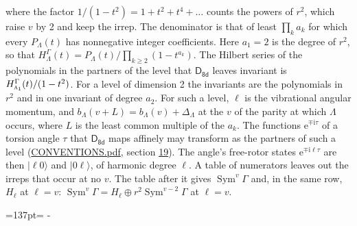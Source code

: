 \documentclass[10pt,a4paper]{article}
\newcommand{\needspace}[1]{\par\penalty-100\begingroup\dimen0=#1\relax\dimen2=\pagegoal
  \advance\dimen2-\pagetotal\ifdim\dimen0>\dimen2\relax\ifdim\dimen2>0pt\vfil\break\fi\fi
  \endgroup}
\numberwithin{equation}{section}
\newcommand{\grp}[1]{\mathsf{#1}}
\newcommand{\irr}[1]{\text{\normalfont\scshape #1}}
\newcommand{\iunit}{\mathrm{i}}
\newcommand{\expe}{\mathrm{e}}
\newcommand{\occ}[1]{\lvert #1\rangle}
\begin{document}
where the factor $1/(1 - t^2) = 1 + t^2 + t^4 + \dots$ counts the powers of $r^2$, which raise $v$ by 2 and keep the irrep. The denominator is that of least $\prod_k a_k$ for which every $P_\Lambda(t)$ has nonnegative integer coefficients. Here $a_1 = 2$ is the degree of $r^2$, so that $H^{\Gamma}_\Lambda(t) = P_\Lambda(t)/\prod_{k\ge2}(1 - t^{a_k})$. The Hilbert series of the polynomials in the partners of the level that $\grp{D_{8d}}$ leaves invariant is $H^{\Gamma}_{\irr{a}_{1}}(t)/(1 - t^2)$. For a level of dimension 2 the invariants are the polynomials in $r^2$ and in one invariant of degree $a_2$. \label{n:index.overtone.period}\label{n:index.increment.unitary}For such a level, $\ell$ is the vibrational angular momentum, and $b_\Lambda(v + L) = b_\Lambda(v) + \Delta_\Lambda$ at the $v$ of the parity at which $\Lambda$ occurs, where $L$ is the least common multiple of the $a_k$. \label{n:local.torsion.angle}The functions $\expe^{\mp\iunit\tau}$ of a torsion angle $\tau$ that $\grp{D_{8d}}$ maps affinely may transform as the partners of such a level (\href{../../CONVENTIONS.pdf}{CONVENTIONS.pdf}, section \href{../../CONVENTIONS.pdf\#conv.19}{19}). The angle's free-rotor states $\expe^{\mp\iunit\ell\tau}$ are then $\occ{\ell 0}$ and $\occ{0 \ell}$, of harmonic degree $\ell$. A table of numerators leaves out the irreps that occur at no $v$. The table after it gives $\operatorname{Sym}^{v}\Gamma$ and, in the same row, $H_\ell$ at $\ell = v$: $\operatorname{Sym}^{v}\Gamma = H_\ell \oplus r^2\operatorname{Sym}^{v-2}\Gamma$ at $\ell = v$.
\needspace{137pt}
\end{document}
